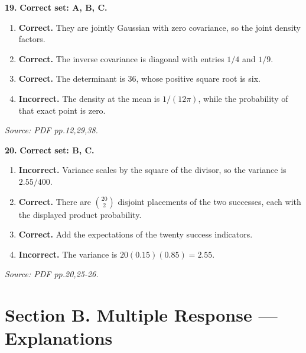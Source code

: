 \documentclass[11pt,a4paper]{article}
\begin{document}
\par\noindent\begin{minipage}{\linewidth}
\textbf{19.} \textbf{Correct set: A, B, C.}
\begin{enumerate}[label=(\Alph*),leftmargin=8mm,itemsep=2pt,topsep=2pt]
\item \textbf{Correct.} They are jointly Gaussian with zero covariance, so the joint density factors.
\item \textbf{Correct.} The inverse covariance is diagonal with entries \(1/4\) and \(1/9\).
\item \textbf{Correct.} The determinant is \(36\), whose positive square root is six.
\item \textbf{Incorrect.} The density at the mean is \(1/(12\pi)\), while the probability of that exact point is zero.
\end{enumerate}
{\footnotesize\textit{Source: PDF pp.12,29,38.}}

\end{minipage}\par\vspace{3mm}
\par\noindent\begin{minipage}{\linewidth}
\textbf{20.} \textbf{Correct set: B, C.}
\begin{enumerate}[label=(\Alph*),leftmargin=8mm,itemsep=2pt,topsep=2pt]
\item \textbf{Incorrect.} Variance scales by the square of the divisor, so the variance is \(2.55/400\).
\item \textbf{Correct.} There are \(\binom{20}{2}\) disjoint placements of the two successes, each with the displayed product probability.
\item \textbf{Correct.} Add the expectations of the twenty success indicators.
\item \textbf{Incorrect.} The variance is \(20(0.15)(0.85)=2.55\).
\end{enumerate}
{\footnotesize\textit{Source: PDF pp.20,25-26.}}

\end{minipage}\par\vspace{3mm}
\newpage\section*{Section B. Multiple Response --- Explanations}
\end{document}
